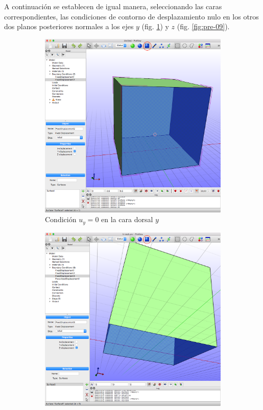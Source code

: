 A continuación se establecen de igual manera, seleccionando las caras correspondientes, las condiciones de contorno de desplazamiento nulo en los otros dos planos posteriores normales a los ejes $y$ (fig. \ref{fig:pre-08}) y $z$ (fig. \ref{fig:pre-09}).
\begin{figure}[!htp]
\centering
\begin{subfigure}[b]{0.48\textwidth}
\includegraphics[width=\textwidth]{figuras_3/scr-pre-08m.png}
\caption{Condición $u_{y}=0$ en la cara dorsal $y$}
\label{fig:pre-08}
\end{subfigure}
\begin{subfigure}[b]{0.48\textwidth}
\includegraphics[width=\textwidth]{figuras_3/scr-pre-09m.png}

\end{subfigure}
\end{figure}
